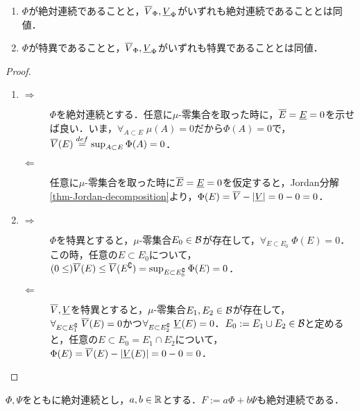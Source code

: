 \documentclass[uplatex, dvipdfmx]{jsreport}
\begin{document}
\begin{theorem}\mbox{}
    \begin{enumerate}
        \item $\Phi$が絶対連続であることと，$\overline{V}_\Phi,\underline{V}_\Phi$がいずれも絶対連続であることとは同値．
        \item $\Phi$が特異であることと，$\overline{V}_\Phi,\underline{V}_\Phi$がいずれも特異であることとは同値．
    \end{enumerate}
\end{theorem}
\begin{proof}\mbox{}
    \begin{enumerate}
        \item \begin{description}
            \item[$\Rightarrow$] $\Phi$を絶対連続とする．任意に$\mu$-零集合を取った時に，$\overline{E}=\underline{E}=0$を示せば良い．いま，$\forall_{A\subset E}\;\mu(A)=0$だから$\Phi(A)=0$で，$\overline{V}(E)\overset{def}{=}\sup_{A\subset E}\Phi(A)=0$．
            \item[$\Leftarrow$] 任意に$\mu$-零集合を取った時に$\overline{E}=\underline{E}=0$を仮定すると，Jordan分解\ref{thm-Jordan-decomposition}より，$\Phi(E)=\overline{V}-\lvert\underline{V}\rvert=0-0=0$．
        \end{description}
        \item \begin{description}
            \item[$\Rightarrow$] $\Phi$を特異とすると，$\mu$-零集合$E_0\in\mathcal{B}$が存在して，$\forall_{E\subset E_0^\comp}\;\Phi(E)=0$．この時，任意の$E\subset E_0^\comp$について，$(0\le)\overline{V}(E)\le\overline{V}(E^\complement)=\sup_{E\subset E_0^\complement}\Phi(E)=0$．
            \item[$\Leftarrow$] $\overline{V},\underline{V}$を特異とすると，$\mu$-零集合$E_1,E_2\in\mathcal{B}$が存在して，$\forall_{E\subset E_1^\complement}\;\overline{V}(E)=0$かつ$\forall_{E\subset E_2^\complement}\;\underline{V}(E)=0$．$E_0:=E_1\cup E_2\in\mathcal{B}$と定めると，任意の$E\subset E_0^\comp=E_1^\comp\cap E_2^\comp$について，$\Phi(E)=\overline{V}(E)-\lvert\underline{V}(E)\rvert=0-0=0$．
        \end{description}
    \end{enumerate}
\end{proof}
\begin{corollary}\label{cor-linearity-of-continuousness}
    $\Phi,\Psi$をともに絶対連続とし，$a,b\in\mathbb{R}$とする．$F:=a\Phi+b\Psi$も絶対連続である．
\end{corollary}
\end{document}
